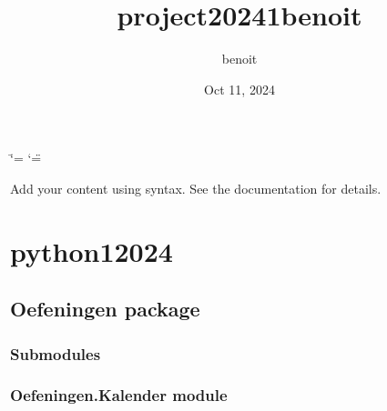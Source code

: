 \documentclass[letterpaper,10pt,english]{sphinxmanual}
\title{project2024\sphinxhyphen{}1\sphinxhyphen{}benoit}
\date{Oct 11, 2024}
\author{benoit}
\begin{document}
\ifdefined\shorthandoff
  \ifnum\catcode`\=\string=\active\shorthandoff{=}\fi
  \ifnum\catcode`\"=\active{}\fi
\fi

\pagestyle{empty}
\sphinxmaketitle
\pagestyle{plain}
\sphinxtableofcontents
\pagestyle{normal}
\label{\detokenize{index::doc}}


\sphinxAtStartPar
Add your content using  syntax. See the
documentation for details.

\sphinxstepscope


\chapter{python\sphinxhyphen{}1\sphinxhyphen{}2024}
\label{\detokenize{modules:python-1-2024}}\label{\detokenize{modules::doc}}
\sphinxstepscope


\section{Oefeningen package}
\label{\detokenize{Oefeningen:oefeningen-package}}\label{\detokenize{Oefeningen::doc}}

\subsection{Submodules}
\label{\detokenize{Oefeningen:submodules}}

\subsection{Oefeningen.Kalender module}
\label{\detokenize{Oefeningen:module-Oefeningen.Kalender}}\label{\detokenize{Oefeningen:oefeningen-kalender-module}}
\end{document}
